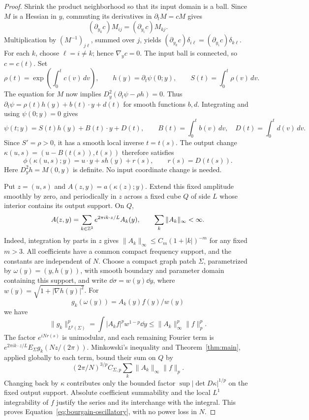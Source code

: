 \begin{proof}
Shrink the product neighborhood so that its input domain is a ball.
Since \(M\) is a Hessian in \(y\), commuting its derivatives in
\(\partial_tM=cM\) gives
\[
 (\partial_{y_k}c)M_{ij}=(\partial_{y_i}c)M_{kj}.
\]
Multiplication by \((M^{-1})_{j\ell}\), summed over \(j\), yields
\((\partial_{y_k}c)\delta_{i\ell}
 =(\partial_{y_i}c)\delta_{k\ell}\).
For each \(k\), choose \(\ell=i\ne k\); hence
\(\nabla_yc=0\). The input ball is connected, so \(c=c(t)\).
Set
\[
 \rho(t)=\exp\!\left(\int_0^t c(v)\,dv\right),\qquad
 h(y)=\partial_t\psi(0;y),\qquad
 S(t)=\int_0^t\rho(v)\,dv.
\]
The equation for \(M\) now implies
\(D_y^2(\partial_t\psi-\rho h)=0\). Thus
\(\partial_t\psi=\rho(t)h(y)+b(t)\cdot y+d(t)\)
for smooth functions \(b,d\). Integrating and using \(\psi(0;y)=0\)
gives
\[
 \psi(t;y)=S(t)h(y)+B(t)\cdot y+D(t),\qquad
 B(t)=\int_0^t b(v)\,dv,\quad D(t)=\int_0^t d(v)\,dv.
\]
Since \(S'=\rho>0\), it has a smooth local inverse \(t=t(s)\).
The output change
\(\kappa(u,s)=(u-B(t(s)),t(s))\) therefore satisfies
\[
 \phi(\kappa(u,s);y)=u\cdot y+s h(y)+r(s),\qquad
 r(s)=D(t(s)).
\]
Here \(D_y^2h=M(0,y)\) is definite. No input coordinate change
is needed.

Put \(z=(u,s)\) and \(A(z,y)=a(\kappa(z);y)\). Extend this fixed
amplitude smoothly by zero, and periodically in \(z\) across a fixed
cube \(Q\) of side \(L\) whose interior contains its output support.
On \(Q\),
\[
 A(z,y)=\sum_{k\in\mathbb Z^3}e^{2\pi i k\cdot z/L}A_k(y),
 \qquad \sum_k\|A_k\|_\infty<\infty.
\]
Indeed, integration by parts in \(z\) gives
\(\|A_k\|_\infty\le C_m(1+|k|)^{-m}\) for any fixed \(m>3\).
All coefficients have a common compact frequency support, and the
constants are independent of \(N\).
Choose a compact graph patch \(\Sigma\), parametrized by
\(\omega(y)=(y,h(y))\), with smooth boundary and parameter domain
containing this support, and write
\(\dd\sigma=w(y)\dd y\), where \(w(y)=\sqrt{1+|\nabla h(y)|^2}\).
For
\[
 g_k(\omega(y))=A_k(y)f(y)/w(y)
\]
we have
\[
 \|g_k\|_{L^p(\Sigma)}^p
 =\int |A_kf|^p w^{1-p}\dd y
 \le\|A_k\|_\infty^p\|f\|_p^p.
\]
The factor \(e^{iNr(s)}\) is unimodular, and each remaining Fourier
term is \(e^{2\pi i k\cdot z/L}E_\Sigma g_k(Nz/(2\pi))\).
Minkowski's inequality and Theorem~\ref{thm:main}, applied globally
to each term, bound their sum on \(Q\) by
\[
 (2\pi/N)^{3/p}C_{\Sigma,p}
       \sum_k\|A_k\|_\infty\|f\|_p.
\]
Changing back by \(\kappa\) contributes only the bounded factor
\(\sup|\det D\kappa|^{1/p}\) on the fixed output support.
Absolute coefficient summability and the local \(L^1\) integrability
of \(f\) justify the series and its interchange with the integral.
This proves Equation~\eqref{eq:bourgain-oscillatory}, with no power
loss in \(N\).
\end{proof}
